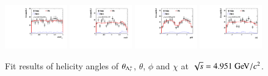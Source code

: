 \begin{figure}[H]\centering
    \includegraphics[width=0.24\textwidth]{figure/polarimetery/angular_plots/pkpi_4946_cos_theta0.pdf}
    \includegraphics[width=0.24\textwidth]{figure/polarimetery/angular_plots/pkpi_4946_cos_theta1.pdf}
    \includegraphics[width=0.24\textwidth]{figure/polarimetery/angular_plots/pkpi_4946_phi1.pdf}
    \includegraphics[width=0.24\textwidth]{figure/polarimetery/angular_plots/pkpi_4946_phi2.pdf}
    \caption{Fit results of helicity angles of $\theta_{\Lambda_{c}^{+}}$, $\theta$, $\phi$ and $\chi$ at $\sqrt{s} = 4.951\gev/c^2$.}
\label{fig:fit_angular_s12}
\end{figure}

